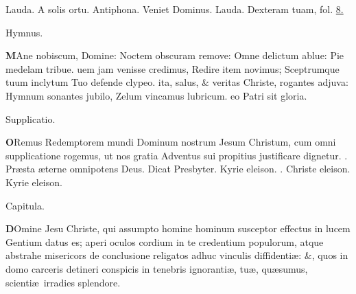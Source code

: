 \documentclass[letter,11pt]{book}
\makeatletter
\DeclareRobustCommand{\Rbar}{\vers@resp{0pt}{R}}
\newcommand{\vers@resp@sym}{\raisebox{0.2ex}{\rotatebox[origin=c]{-20}{$\m@th\rceil$}}}
\newcommand{\vers@resp}[2]{%
  {\ooalign{\hidewidth\kern#1\vers@resp@sym\hidewidth\cr#2\cr}}%
}%
\def\R{\color{Red} \Rbar . \color{black}}
\makeatother
\begin{document}
\begin{multicols}{2}
\par \noindent \color{Red} Lauda. \color{black} A solis ortu.
\newline \color{Red} Antiphona. \color{black} Veniet Dominus.
\newline \color{Red} Lauda. \color{black} Dexteram tuam, \color{Red} fol. \color{black} \hyperlink{page.8}{8.}
\vspace{-.5em} \begin{center} \color{Red} Hymnus. \end{center} \vspace{-.5em}
\lettrine[lines=2]{\bfseries \color{Red} M}{}Ane nobiscum, Domine:
\newline Noctem obscuram remove:
\newline \indent Omne delictum ablue:
\newline \indent Pie medelam tribue.
uem jam venisse credimus,
\newline \indent Redire item novimus;
\newline \indent Sceptrumque tuum inclytum
\newline \indent Tuo defende clypeo.
ita, salus, \& veritas
\newline \indent Christe, rogantes adjuva:
\newline \indent Hymnum sonantes jubilo,
\newline \indent Zelum vincamus lubricum.
eo Patri sit gloria.
\vspace{-.5em} \begin{center} \color{Red} Supplicatio. \end{center} \vspace{-.5em}
\lettrine[lines=2]{\bfseries \color{Red} O}{}Remus Redemptorem mundi Dominum nostrum Jesum Christum, cum omni supplicatione rogemus, ut nos gratia Adventus sui propitius justificare dignetur.
\R Pr\ae sta \ae terne omnipotens Deus.
\newline \color{Red} Dicat Presbyter. \color{black} Kyrie eleison. \R Christe eleison. Kyrie eleison.
\vspace{-.5em} \begin{center} \color{Red} Capitula. \end{center} \vspace{-.5em}
\lettrine[lines=2]{\bfseries \color{Red} D}{}Omine Jesu Christe, qui assumpto homine hominum susceptor effectus in lucem Gentium datus es; aperi oculos cordium in te credentium populorum, atque abstrahe misericors de conclusione religatos adhuc vinculis diffidenti\ae : \&, quos in domo carceris detineri conspicis in tenebris ignoranti\ae , tu\ae , qu\ae sumus, scienti\ae \ irradies splendore.

\end{multicols}
\end{document}
